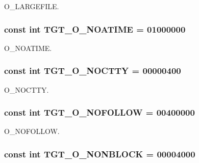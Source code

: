 O\_\-LARGEFILE. \hypertarget{classArmLinux32_a0ee8b0c23c2babc48e978e872b03c82c}{
\subsubsection[{TGT\_\-O\_\-NOATIME}]{\setlength{\rightskip}{0pt plus 5cm}const int {\bf TGT\_\-O\_\-NOATIME} = 01000000}}
\label{classArmLinux32_a0ee8b0c23c2babc48e978e872b03c82c}


O\_\-NOATIME. \hypertarget{classArmLinux32_adfd4240281579e5f60c5e22c601225d8}{
\subsubsection[{TGT\_\-O\_\-NOCTTY}]{\setlength{\rightskip}{0pt plus 5cm}const int {\bf TGT\_\-O\_\-NOCTTY} = 00000400}}
\label{classArmLinux32_adfd4240281579e5f60c5e22c601225d8}


O\_\-NOCTTY. \hypertarget{classArmLinux32_a9c27f68ab31ddfdd3e35800ea1f02a89}{
\subsubsection[{TGT\_\-O\_\-NOFOLLOW}]{\setlength{\rightskip}{0pt plus 5cm}const int {\bf TGT\_\-O\_\-NOFOLLOW} = 00400000}}
\label{classArmLinux32_a9c27f68ab31ddfdd3e35800ea1f02a89}


O\_\-NOFOLLOW. \hypertarget{classArmLinux32_a0ea5420b4c9b45ba342a266fb77ac942}{
\subsubsection[{TGT\_\-O\_\-NONBLOCK}]{\setlength{\rightskip}{0pt plus 5cm}const int {\bf TGT\_\-O\_\-NONBLOCK} = 00004000}}
\label{classArmLinux32_a0ea5420b4c9b45ba342a266fb77ac942}


